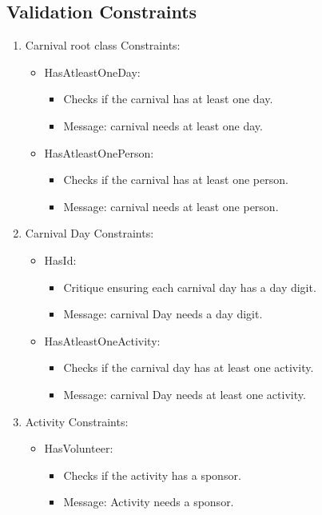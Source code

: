 \documentclass[a4paper,11pt]{report}
\begin{document}
\subsection{Validation Constraints}

\begin{enumerate}
	\item Carnival root class Constraints:
	\begin{itemize}
		\item HasAtleastOneDay:
			\begin{itemize}
				\item Checks if the carnival has at least one day.
				\item Message: carnival needs at least one day.
			\end{itemize}
		\item HasAtleastOnePerson:
			\begin{itemize}
				\item Checks if the carnival has at least one person.
				\item Message: carnival needs at least one person.
			\end{itemize}
	\end{itemize}
	\item Carnival Day Constraints:
	\begin{itemize}
		\item HasId:
			\begin{itemize}
				\item Critique ensuring each carnival day has a day digit.
				\item Message: carnival Day needs a day digit.
			\end{itemize}
		\item HasAtleastOneActivity:
			\begin{itemize}
				\item Checks if the carnival day has at least one activity.
				\item Message: carnival Day needs at least one activity.
			\end{itemize}
	\end{itemize}\newpage
	\item Activity Constraints:
	\begin{itemize}
		\item HasVolunteer:
		\begin{itemize}
			\item Checks if the activity has a sponsor.
			\item Message: Activity needs a sponsor.

\end{itemize}
\end{itemize}
\end{enumerate}
\end{document}
